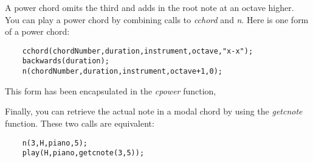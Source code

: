 \documentclass{article}
\begin{document}
A power chord omits the third and adds in the root note at
an octave higher.
You can play a power chord by combining calls to {\it cchord} and {\it n}.
Here is one form of a power chord:

\begin{verbatim}
    cchord(chordNumber,duration,instrument,octave,"x-x");
    backwards(duration);
    n(chordNumber,duration,instrument,octave+1,0);
\end{verbatim}

This form has been encapsulated in the {\it cpower} function,

Finally, you can retrieve
the actual note in a modal chord by using the {\it getcnote}
function. These two calls are equivalent:

\begin{verbatim}
    n(3,H,piano,5);
    play(H,piano,getcnote(3,5));
\end{verbatim}
\end{document}
